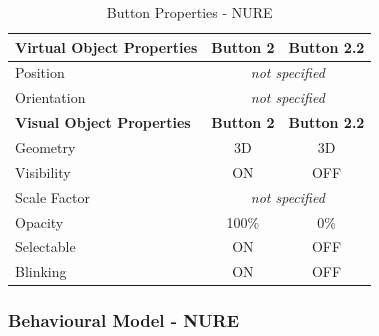 \begin{itemize}
\begin{itemize}
        \begin{table}[h]
        \centering
        \begin{tabular}{|l|c|c|}
        \hline
        \textbf{Virtual Object Properties} & \textbf{Button 2}   & \textbf{Button 2.2}   \\ \hline
        Position                           & \multicolumn{2}{c|}{\textit{not specified}} \\ \hline
        Orientation                        & \multicolumn{2}{c|}{\textit{not specified}} \\ \hline
        \textbf{Visual Object Properties}  & \textbf{Button 2}   & \textbf{Button 2.2}   \\ \hline
        Geometry                           & 3D                  & 3D                    \\ \hline
        Visibility                         & ON                  & OFF                   \\ \hline
        Scale Factor                       & \multicolumn{2}{c|}{\textit{not specified}} \\ \hline
        Opacity                            & 100\%               & 0\%                   \\ \hline
        Selectable                         & ON                  & OFF                   \\ \hline
        Blinking                           & ON                  & OFF                   \\ \hline
        \end{tabular}
        \caption{Button Properties - NURE}
        \label{tab:NUREButtonproperties}
        \end{table}
    \end{itemize}
\end{itemize}

\subsubsection*{Behavioural Model - NURE}

